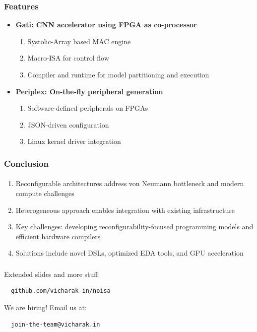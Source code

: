 \documentclass{beamer}
\begin{document}
{\begin{frame}[fragile]
\end{frame}

\begin{frame}[fragile]
  \frametitle{Features}
  \begin{itemize}
    \item \textbf{Gati: CNN accelerator using FPGA as co-processor}
      \begin{enumerate}
        \item Systolic-Array based MAC engine
        \item Macro-ISA for control flow
        \item Compiler and runtime for model partitioning and execution
      \end{enumerate}

    \item \textbf{Periplex: On-the-fly peripheral generation}
      \begin{enumerate}
        \item Software-defined peripherals on FPGAs
        \item JSON-driven configuration
        \item Linux kernel driver integration
      \end{enumerate}
      \end{itemize}
\end{frame}

\begin{frame}[fragile]
  \frametitle{Conclusion}
  \framesubtitle{}
  \begin{enumerate}
    \item Reconfigurable architectures address von Neumann bottleneck and modern compute challenges
    \item Heterogeneous approach enables integration with existing infrastructure
    \item Key challenges: developing reconfigurability-focused programming models and efficient hardware compilers
    \item Solutions include novel DSLs, optimized EDA tools, and GPU acceleration
  \end{enumerate}
\end{frame}

\begin{frame}[fragile]
  \frametitle{}
  \framesubtitle{}

  Extended slides and more stuff: 

  \begin{verbatim}
  github.com/vicharak-in/noisa
  \end{verbatim}

  We are hiring! Email us at: 

  \begin{verbatim}
  join-the-team@vicharak.in
  \end{verbatim}

\end{frame}

}
\end{document}
